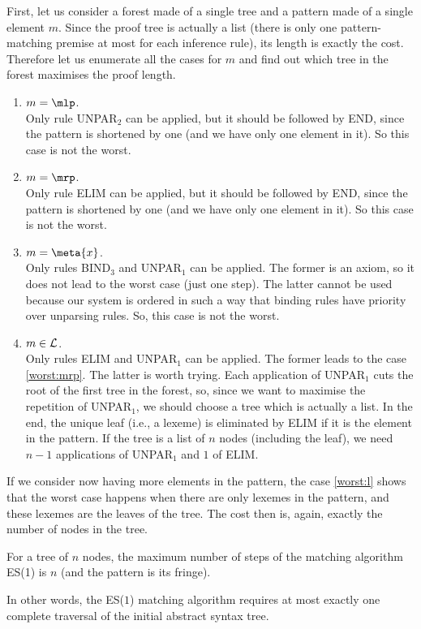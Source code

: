 First, let us consider a forest made of a single tree and a pattern
made of a single element \(m\). Since the proof tree is actually a
list (there is only one pattern\hyp{}matching premise at most for each
inference rule), its length is exactly the cost. Therefore let us
enumerate all the cases for \(m\) and find out which tree in the
forest maximises the proof length.
\begin{enumerate}

  \item \(m = \mlp\).\\ Only rule \textsf{UNPAR}\(_2\) can be applied,
    but it should be followed by \textsf{END}, since the pattern is
    shortened by one (and we have only one element in it). So this
    case is not the worst.

  \item \label{worst:mrp} \(m = \mrp\).\\ Only rule \textsf{ELIM} can
    be applied, but it should be followed by \textsf{END}, since the
    pattern is shortened by one (and we have only one element in
    it). So this case is not the worst.

  \item \(m = \meta{x}\).\\ Only rules \textsf{BIND}\(_3\) and
    \textsf{UNPAR}\(_1\) can be applied. The former is an axiom, so it
    does not lead to the worst case (just one step). The latter cannot
    be used because our system is ordered in such a way that binding
    rules have priority over unparsing rules. So, this case is not the
    worst.

  \item \label{worst:l} \(m \in {\cal L}\).\\ Only rules \textsf{ELIM}
    and \textsf{UNPAR}\(_1\) can be applied. The former leads to the
    case \ref{worst:mrp}. The latter is worth trying. Each application
    of \textsf{UNPAR}\(_1\) cuts the root of the first tree in the
    forest, so, since we want to maximise the repetition of
    \textsf{UNPAR}\(_1\), we should choose a tree which is actually a
    list. In the end, the unique leaf (i.e., a lexeme) is eliminated
    by \textsf{ELIM} if it is the element in the pattern. If the tree
    is a list of \(n\) nodes (including the leaf), we need \(n-1\)
    applications of \textsf{UNPAR}\(_1\) and \(1\) of \textsf{ELIM}.

\end{enumerate}
If we consider now having more elements in the pattern, the case
\ref{worst:l} shows that the worst case happens when there are only
lexemes in the pattern, and these lexemes are the leaves of the
tree. The cost then is, again, exactly the number of nodes in the
tree.
\begin{theorem}
For a tree of \(n\) nodes, the maximum number of steps of the matching
algorithm ES(1) is \(n\) (and the pattern is its fringe).
\end{theorem}
\noindent In other words, the ES(\(1\)) matching algorithm requires at
most exactly one complete traversal of the initial abstract syntax
tree.
